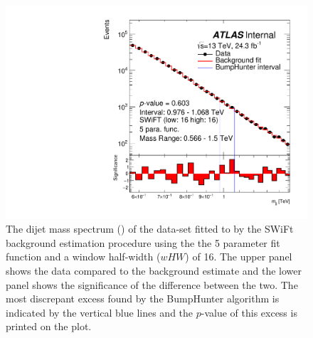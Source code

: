 \vspace{-2mm}
\begin{figure}[!thb]
\captionsetup[subfigure]{aboveskip=0pt,justification=centering}
\centering
  \includegraphics[width=0.7\linewidth, angle=0]{figs/Dibjet/LowMass/FitStudy_min566/bhFit_unblind_5para_low16_high16.pdf}
\vspace{3pt}
\caption{\label{fig:bhFit_lm_unblind}
   The dijet mass spectrum (\mjj) of the \lm{} data-set fitted to by the SWiFt background estimation procedure
   using the the 5 parameter fit function and a window half-width ($wHW$) of 16.
   The upper panel shows the data compared to the background estimate and the lower panel shows the significance of the difference between the two.
   The most discrepant excess found by the {\sc BumpHunter} algorithm is indicated by the vertical blue lines and the \mbox{$p$-value} of this excess is printed on the plot. }
\end{figure}

